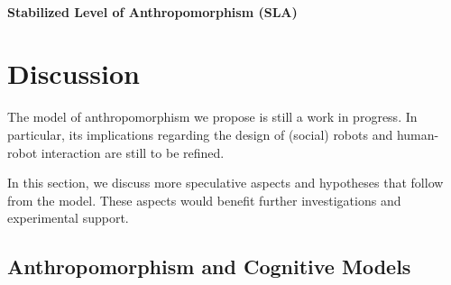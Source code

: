 \documentclass[lettersize, apacite, twoside, HRI]{apa_HRI}
\begin{document}
\paragraph{Stabilized Level of Anthropomorphism (SLA)}


%
%
%
%
%
%

\section{Discussion}
\label{sec:discussion}

The model of anthropomorphism we propose is still a work in progress. In
particular, its implications regarding the design of (social) robots and
human-robot interaction are still to be refined.

In this section, we discuss more speculative aspects and hypotheses that follow
from the model. These aspects would benefit further investigations and
experimental support.

\subsection{Anthropomorphism and Cognitive Models}
\label{sec:cognitivemodel}
\end{document}

